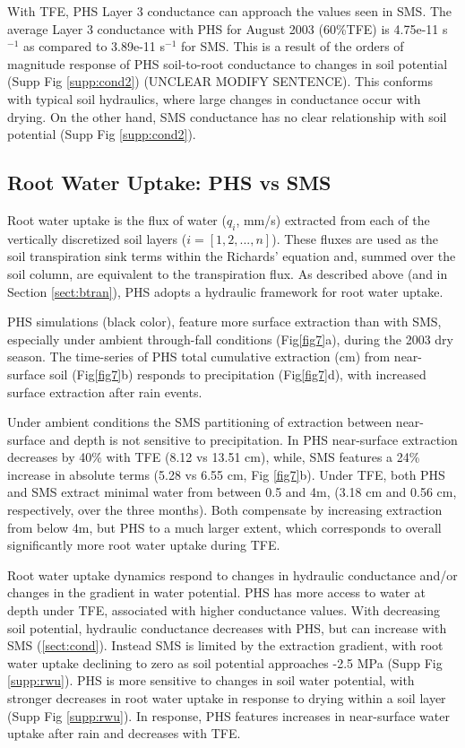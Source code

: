 \documentclass[draft,linenumbers]{agujournal}
\begin{document}
    With TFE, PHS Layer 3 conductance can approach the values seen in SMS. The average Layer 3 conductance with PHS for August 2003 (60\%TFE) is 4.75e-11 s$^{-1}$ as compared to 3.89e-11 s$^{-1}$ for SMS. This is a result of the orders of magnitude response of PHS soil-to-root conductance to changes in soil potential (Supp Fig \ref{supp:cond2}) (UNCLEAR MODIFY SENTENCE).  This conforms with typical soil hydraulics, where large changes in conductance occur with drying. On the other hand, SMS conductance has no clear relationship with soil potential (Supp Fig \ref{supp:cond2}). 

\subsection{Root Water Uptake: PHS vs SMS}
\label{sect:rwu}

    Root water uptake is the flux of water ($q_i$, mm/s) extracted from each of the vertically discretized soil layers ($i=\left[1,2,...,n\right]$). These fluxes are used as the soil transpiration sink terms within the Richards' equation \citep{oleson2013} and, summed over the soil column, are equivalent to the transpiration flux. As described above (and in Section \ref{sect:btran}), PHS adopts a hydraulic framework for root water uptake. 

    PHS simulations (black color), feature more surface extraction than with SMS, especially under ambient through-fall conditions (Fig\ref{fig7}a), during the 2003 dry season. The time-series of PHS total cumulative extraction (cm) from near-surface soil (Fig\ref{fig7}b) responds to precipitation (Fig\ref{fig7}d), with increased surface extraction after rain events.
    
    Under ambient conditions the SMS partitioning of extraction between near-surface and depth is not sensitive to precipitation. In PHS near-surface extraction decreases by 40\% with TFE (8.12 vs 13.51 cm), while, SMS features a 24\% increase in absolute terms (5.28 vs 6.55 cm, Fig \ref{fig7}b). Under TFE, both PHS and SMS extract minimal water from between 0.5 and 4m, (3.18 cm and 0.56 cm, respectively, over the three months). Both compensate by increasing extraction from below 4m, but PHS to a much larger extent, which corresponds to overall significantly more root water uptake during TFE.
    
    Root water uptake dynamics respond to changes in hydraulic conductance and/or changes in the gradient in water potential. PHS has more access to water at depth under TFE, associated with higher conductance values. With decreasing soil potential, hydraulic conductance decreases with PHS, but can increase with SMS (\ref{sect:cond}). Instead SMS is limited by the extraction gradient, with root water uptake declining to zero as soil potential approaches -2.5 MPa (Supp Fig \ref{supp:rwu}). PHS is more sensitive to changes in soil water potential, with stronger decreases in root water uptake in response to drying within a soil layer (Supp Fig \ref{supp:rwu}). In response, PHS features increases in near-surface water uptake after rain and decreases with TFE.
\end{document}
